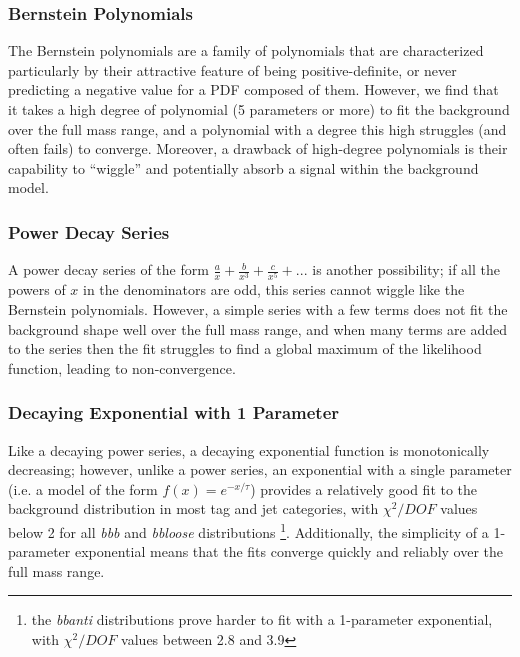 \subsubsection{Bernstein Polynomials}
The Bernstein polynomials are a family of polynomials that are characterized
particularly by their attractive feature of being positive-definite, or never
predicting a negative value for a PDF composed of them.  However, we find
that it takes a high degree of polynomial (5 parameters or more) to fit the
background over the full mass range, and a polynomial with a 
degree this high struggles (and often fails) to converge.  Moreover, a
drawback of high-degree polynomials is their capability to ``wiggle'' and
potentially absorb a signal within the background model.

\subsubsection{Power Decay Series}
A power decay series of the form $\frac{a}{x} + \frac{b}{x^3} + \frac{c}{x^5} + ...$
is another possibility; if all the powers of $x$ in the denominators are
odd, this series cannot wiggle like the Bernstein polynomials.  However,
a simple series with a few terms does not fit the background shape well 
over the full mass range, and when many terms are added to the series then
the fit struggles to find a global maximum of the likelihood function, leading
to non-convergence.

\subsubsection{Decaying Exponential with 1 Parameter}
Like a decaying power series, a decaying exponential function is monotonically
decreasing; however, unlike a power series, an exponential with a single
parameter (i.e. a model of the form $f(x)=e^{-x/\tau}$) provides 
a relatively good fit to the background distribution in most tag and jet
categories, with $\chi^2/DOF$ values below 2 for all \textit{bbb} and \textit{bbloose}
distributions \footnote{the \textit{bbanti} distributions prove harder to
fit with a 1-parameter exponential, with $\chi^2/DOF$ values between 2.8 and 3.9}.
Additionally, the simplicity of a 1-parameter exponential means that the
fits converge quickly and reliably over the full mass range.

